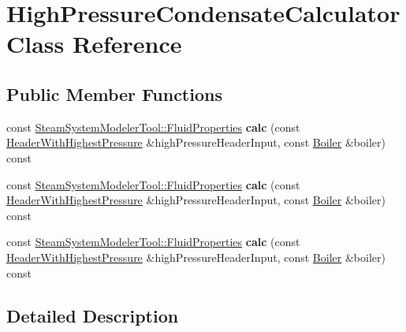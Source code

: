 \hypertarget{class_high_pressure_condensate_calculator}{}\section{High\+Pressure\+Condensate\+Calculator Class Reference}
\label{class_high_pressure_condensate_calculator}
\subsection*{Public Member Functions}
\begin{DoxyCompactItemize}
\item 
\mbox{\label{class_high_pressure_condensate_calculator_a69b3cd9b8c44dea0296fc13c45fce6ce}} 
const \hyperlink{struct_steam_system_modeler_tool_1_1_fluid_properties}{Steam\+System\+Modeler\+Tool\+::\+Fluid\+Properties} {\bfseries calc} (const \hyperlink{class_header_with_highest_pressure}{Header\+With\+Highest\+Pressure} \&high\+Pressure\+Header\+Input, const \hyperlink{class_boiler}{Boiler} \&boiler) const
\item 
\mbox{\label{class_high_pressure_condensate_calculator_a69b3cd9b8c44dea0296fc13c45fce6ce}} 
const \hyperlink{struct_steam_system_modeler_tool_1_1_fluid_properties}{Steam\+System\+Modeler\+Tool\+::\+Fluid\+Properties} {\bfseries calc} (const \hyperlink{class_header_with_highest_pressure}{Header\+With\+Highest\+Pressure} \&high\+Pressure\+Header\+Input, const \hyperlink{class_boiler}{Boiler} \&boiler) const
\item 
\mbox{\label{class_high_pressure_condensate_calculator_a69b3cd9b8c44dea0296fc13c45fce6ce}} 
const \hyperlink{struct_steam_system_modeler_tool_1_1_fluid_properties}{Steam\+System\+Modeler\+Tool\+::\+Fluid\+Properties} {\bfseries calc} (const \hyperlink{class_header_with_highest_pressure}{Header\+With\+Highest\+Pressure} \&high\+Pressure\+Header\+Input, const \hyperlink{class_boiler}{Boiler} \&boiler) const
\end{DoxyCompactItemize}


\subsection{Detailed Description}


